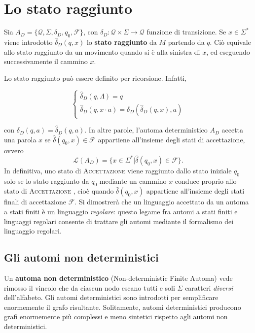 \documentclass[10pt]{\classname}
\theoremstyle{definition}
\theoremstyle{definition}
\theoremstyle{definition}
\theoremstyle{definition}
\begin{document}
\section{Lo stato raggiunto}

Sia $A_D = \{ \mathcal Q, \Sigma, \delta_D, q_0, \mathcal F\}$, con $\delta_D:\mathcal Q \times \Sigma \rightarrow \mathcal Q$ funzione di transizione. Se $x\in
\Sigma^*$ viene introdotto $\hat{\delta}_D (q, x)$ lo \textbf{stato raggiunto} da
$M$ partendo da $q$. Ciò equivale allo stato raggiunto da un movimento quando
si è alla sinistra di $x$, ed eseguendo successivamente il cammino $x$.

Lo stato raggiunto può essere definito per ricorsione. Infatti,

$$
\left\{
    \begin{array}{l}
        \hat{\delta}_D (q, \Lambda) = q \\
        \hat{\delta}_D (q, x\cdot a) = \delta _D (\hat{\delta}_D (q, x), a)
    \end{array}
\right.
$$

con $\delta_D(q, a) = \hat{\delta}_D(q, a)$. In altre parole, l'automa deterministico $A_D$ accetta una
parola $x$ se $\hat{\delta}(q_0, x) \in \mathcal F$ appartiene all'insieme degli stati di
accettazione, ovvero $$\mathcal L(A_D) = \{x\in \Sigma^* | \hat{\delta}(q_0, x)
\in \mathcal F\}.$$ In definitiva, uno stato di \textsc{Accettazione } viene
raggiunto dallo stato iniziale $q_0$ solo se lo stato raggiunto da $q_0$
mediante un cammino $x$ conduce proprio allo stato di \textsc{Accettazione },
cioè quando $\hat{\delta}(q_0, x)$ appartiene all'insieme degli stati finali di
accettazione $\mathcal F$. Si dimostrerà che un linguaggio accettato da un automa a stati
finiti è un linguaggio \emph{regolare}: questo legame fra automi a stati finiti
e linguaggi regolari consente di trattare gli automi mediante il formalismo dei
linguaggio regolari.

\subsection{Gli automi non deterministici}

Un \textbf{automa non deterministico} (Non-deterministic Finite Automa) vede
rimosso il vincolo che da ciascun nodo escano tutti e soli $\Sigma$ caratteri
\emph{diversi} dell'alfabeto. Gli automi deterministici sono introdotti per
semplificare enormemente il grafo risultante. Solitamente, automi
deterministici producono grafi enormemente più complessi e meno sintetici
rispetto agli automi non deterministici.
\end{document}
